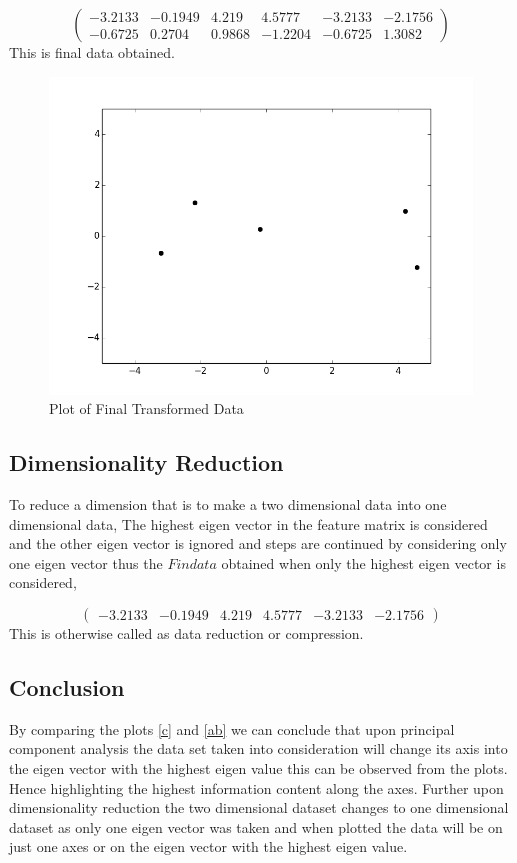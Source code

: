 \documentclass[a4paper]{article}
\begin{document}
$$\begin{pmatrix}-3.2133 & -0.1949 & 4.219 & 4.5777 & -3.2133 & -2.1756\\ -0.6725 & 0.2704 & 0.9868 & -1.2204 & -0.6725 & 1.3082 \end{pmatrix}$$
This is final data obtained. 

\begin{figure}[!htbp]
   \centering
   \includegraphics[scale = 0.4]{fig4.png} %
   \caption{Plot of Final Transformed Data}\label{ab}
   \label{fig:example3}
\end{figure}

\subsection{Dimensionality Reduction}
To reduce a dimension that is to make a two dimensional data into one dimensional data, The highest eigen vector in the feature matrix is considered and the other eigen vector is ignored and steps are continued by considering only one eigen vector thus the $Findata$ obtained when only the highest eigen vector is considered,

$$\begin{pmatrix}-3.2133 & -0.1949 & 4.219 & 4.5777 & -3.2133 & -2.1756 \end{pmatrix}$$
\parskip 0pt 
This is otherwise called as data reduction or compression.

\subsection{Conclusion}
By comparing the plots \ref{c} and \ref{ab} we can conclude that upon principal component analysis the data set taken into consideration will change its axis into the eigen vector with the highest eigen value this can be observed from the plots. Hence highlighting the highest information content along the axes. Further upon dimensionality reduction the two dimensional dataset changes to one dimensional dataset as only one eigen vector was taken and when plotted the data will be on just one axes or on the eigen vector with the highest eigen value.
\end{document}
